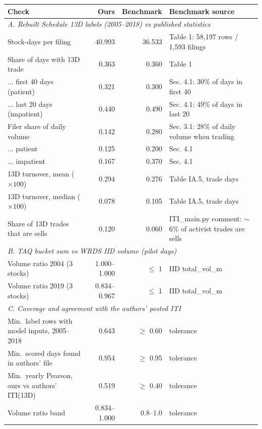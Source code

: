 \begin{tabular}{lrrl}
\toprule
Check & Ours & Benchmark & Benchmark source \\
\midrule
\multicolumn{4}{l}{\textit{A. Rebuilt Schedule 13D labels (2005--2018) vs published statistics}} \\
Stock-days per filing & 40.993 & 36.533 & Table 1: 58,197 rows / 1,593 filings \\
Share of days with 13D trade & 0.363 & 0.360 & Table 1 \\
  ... first 40 days (patient) & 0.321 & 0.300 & Sec. 4.1: 30\% of days in first 40 \\
  ... last 20 days (impatient) & 0.440 & 0.490 & Sec. 4.1: 49\% of days in last 20 \\
Filer share of daily volume & 0.142 & 0.280 & Sec. 3.1: 28\% of daily volume when trading \\
  ... patient & 0.125 & 0.200 & Sec. 4.1 \\
  ... impatient & 0.167 & 0.370 & Sec. 4.1 \\
13D turnover, mean ($\times 100$) & 0.294 & 0.276 & Table IA.5, trade days \\
13D turnover, median ($\times 100$) & 0.078 & 0.105 & Table IA.5, trade days \\
Share of 13D trades that are sells & 0.120 & 0.060 & ITI\_main.py comment: $\sim$6\% of activist trades are sells \\
\midrule
\multicolumn{4}{l}{\textit{B. TAQ bucket sum vs WRDS IID volume (pilot days)}} \\
Volume ratio 2004 (3 stocks) & 1.000--1.000 & $\leq$ 1 & IID total\_vol\_m \\
Volume ratio 2019 (3 stocks) & 0.834--0.967 & $\leq$ 1 & IID total\_vol\_m \\
\midrule
\multicolumn{4}{l}{\textit{C. Coverage and agreement with the authors' posted ITI}} \\
Min.\ label rows with model inputs, 2005--2018 & 0.643 & $\geq$ 0.60 & tolerance \\
Min.\ scored days found in authors' file & 0.954 & $\geq$ 0.95 & tolerance \\
Min.\ yearly Pearson, ours vs authors' ITI(13D) & 0.519 & $\geq$ 0.40 & tolerance \\
Volume ratio band & 0.834--1.000 & 0.8--1.0 & tolerance \\
\bottomrule
\end{tabular}

